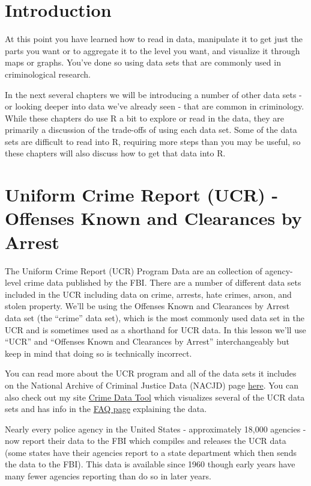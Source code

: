 \documentclass[
  12pt,
]{book}
\begin{document}
\hypertarget{introduction}{%
\chapter{Introduction}\label{introduction}}

At this point you have learned how to read in data, manipulate it to get just the parts you want or to aggregate it to the level you want, and visualize it through maps or graphs. You've done so using data sets that are commonly used in criminological research.

In the next several chapters we will be introducing a number of other data sets - or looking deeper into data we've already seen - that are common in criminology. While these chapters do use R a bit to explore or read in the data, they are primarily a discussion of the trade-offs of using each data set. Some of the data sets are difficult to read into R, requiring more steps than you may be useful, so these chapters will also discuss how to get that data into R.

\hypertarget{ucr}{%
\chapter{Uniform Crime Report (UCR) - Offenses Known and Clearances by Arrest}\label{ucr}}

The Uniform Crime Report (UCR) Program Data are an collection of agency-level crime data published by the FBI. There are a number of different data sets included in the UCR including data on crime, arrests, hate crimes, arson, and stolen property. We'll be using the Offenses Known and Clearances by Arrest data set (the ``crime'' data set), which is the most commonly used data set in the UCR and is sometimes used as a shorthand for UCR data. In this lesson we'll use ``UCR'' and ``Offenses Known and Clearances by Arrest'' interchangeably but keep in mind that doing so is technically incorrect.

You can read more about the UCR program and all of the data sets it includes on the National Archive of Criminal Justice Data (NACJD) page \href{https://www.icpsr.umich.edu/icpsrweb/content/NACJD/guides/ucr.html}{here}. You can also check out my site \href{http://crimedatatool.com}{Crime Data Tool} which visualizes several of the UCR data sets and has info in the \href{http://crimedatatool.com/faq.html}{FAQ page} explaining the data.

Nearly every police agency in the United States - approximately 18,000 agencies - now report their data to the FBI which compiles and releases the UCR data (some states have their agencies report to a state department which then sends the data to the FBI). This data is available since 1960 though early years have many fewer agencies reporting than do so in later years.
\end{document}
